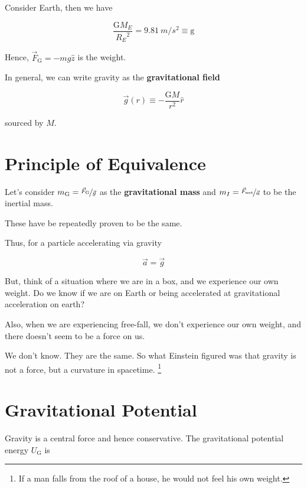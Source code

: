 Consider Earth, then we have

\begin{equation}
	\frac{\mathrm{G} M_E}{{R_E}^2} = \SI{9.81}{m/s^2} \equiv \mathrm{g}
\end{equation}

Hence, $\vec F_\mathrm{G} = - mg\hat z$ is the weight.

In general, we can write gravity as the \textbf{gravitational field}

\begin{equation}
	\vec{g} (r) \equiv - \frac{\mathrm{G} M}{r^2} \hat r
\end{equation}

sourced by $M$.

\section{Principle of Equivalence}

Let's consider $m_\mathrm{G} = \nicefrac{\vec F_\mathrm{G}}{\vec g}$ as the \textbf{gravitational mass} and $m_I = \nicefrac{\vec F_\mathrm{net}}{\vec a}$ to be the inertial mass.

These have be repeatedly proven to be the same.

Thus, for a particle accelerating via gravity

\begin{equation}
	\vec a = \vec g
\end{equation}

\begin{remark}
	But, think of a situation where we are in a box, and we experience our own weight. Do we know if we are on Earth or being accelerated at gravitational acceleration on earth?

	Also, when we are experiencing free-fall, we don't experience our own weight, and there doesn't seem to be a force on us.

	We don't know. They are the same. So what Einstein figured was that gravity is not a force, but a curvature in spacetime. \footnote{If a man falls from the roof of a house, he would not feel his own weight.}
\end{remark}

\section{Gravitational Potential}

Gravity is a central force and hence conservative. The gravitational potential energy $U_\mathrm{G}$ is


